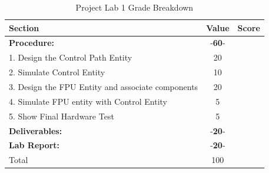 \documentclass{article}
\begin{document}
\begin{table}[!htb]
  \begin{center}
    \begin{tabular}[width=0.9\textwidth]{|l|c|l|}
       \hline
       Section & Value & Score\\
       \hline 
       \multicolumn{1}{|l}{\textbf{Procedure:}}  & -\textbf{60}- &\\
       \hline
       1. Design the Control Path Entity & 20 &\\
       \hline
       2. Simulate Control Entity & 10 &\\
       \hline
       3. Design the FPU Entity and associate components & 20 &\\
       \hline
       4. Simulate FPU entity with Control Entity & 5 &\\
       \hline
       5. Show Final Hardware Test & 5 &\\
       \hline
       \multicolumn{1}{|l}{\textbf{Deliverables:}}  & -\textbf{20}- &\\
       \hline
       \multicolumn{1}{|l}{\textbf{Lab Report:}}  & -\textbf{20}- &\\
       \hline
       \hline
       \multicolumn{1}{|l}{Total} & \multicolumn{1}{c|}{100} &\\
       \hline
    \end{tabular}
  \end{center}
  \caption{Project Lab 1 Grade Breakdown}
\end{table}
\end{document}
